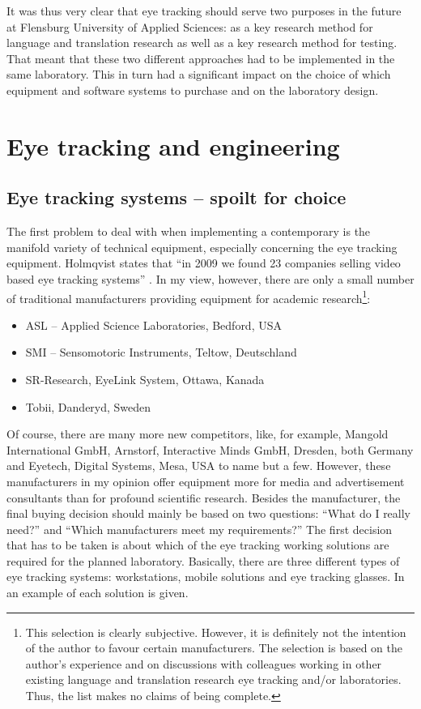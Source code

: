 \documentclass[output=paper]{langsci/langscibook}
\begin{document}
It was thus very clear that eye tracking should serve two purposes in the future  at Flensburg University of Applied Sciences: as a key research method for language and translation research as well as a key research method for  testing. That meant that these two different approaches had to be implemented in the same laboratory. This in turn had a significant impact on the choice of which equipment and software systems to purchase and on the laboratory design.


\section{Eye tracking and  engineering }

\subsection{Eye tracking systems -- spoilt for choice }

The first problem to deal with when implementing a contemporary  is the manifold variety of technical equipment, especially concerning the eye tracking equipment. Holmqvist states that ``in 2009 we found 23 companies selling video based eye tracking systems'' \citep[12]{Holmqvist2011}. In my view, however, there are only a small number of traditional manufacturers providing equipment for academic research\footnote{ This selection is clearly subjective. However, it is definitely not the intention of the author to favour certain manufacturers. The selection is based on the author's experience and on discussions with colleagues working in other existing language and translation research eye tracking and/or  laboratories. Thus, the list makes no claims of being complete.}: 

\begin{itemize}
\item ASL -- Applied Science Laboratories, Bedford, USA
\item SMI -- Sensomotoric Instruments, Teltow, Deutschland
\item SR-Research, EyeLink System, Ottawa, Kanada
\item Tobii, Danderyd, Sweden 
\end{itemize}


Of course, there are many more new competitors, like, for example, Mangold International GmbH, Arnstorf, Interactive Minds GmbH, Dresden, both Germany and Eyetech, Digital Systems, Mesa, USA to name but a few. However, these manufacturers in my opinion offer equipment more for media and advertisement consultants than for profound scientific research. Besides the manufacturer, the final buying decision should mainly be based on two questions: ``What do I really need?'' and ``Which manufacturers meet my requirements?'' The first decision that has to be taken is about which of the eye tracking working solutions are required for the planned laboratory. Basically, there are three different types of eye tracking systems: workstations, mobile solutions and eye tracking glasses. In  an example of each solution is given.
\end{document}
